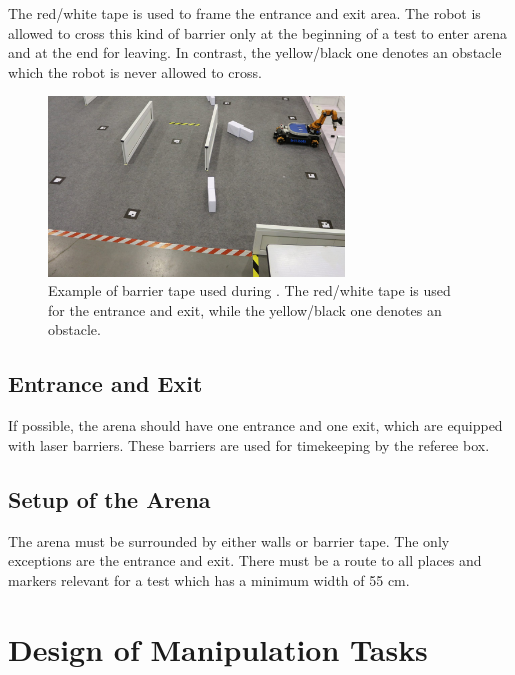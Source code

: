 The red/white tape is used to frame the entrance and exit area. The robot is allowed to cross this kind of barrier only at the beginning of a test to enter arena and at the end for leaving. In contrast, the yellow/black one denotes an obstacle which the robot is never allowed to cross. 

\begin{figure} [h!]
\centering
\includegraphics[width= 0.7\textwidth ]{./images/barrier_tapes_in_china15.jpg}
\caption{Example of barrier tape used during . The red/white tape is used for the entrance and exit, while the yellow/black one denotes an obstacle.}
\label{fig:barrier_tape}
\end{figure}


\subsection{Entrance and Exit}
If possible, the arena should have one entrance and one exit, which are equipped with laser barriers. These barriers are used for timekeeping by the referee box.

\subsection{Setup of the Arena}
The arena must be surrounded by either walls or barrier tape. The only exceptions are the entrance and exit. There must be a route to all places and markers relevant for a test which has a minimum width of 55 cm.

\section{Design of Manipulation Tasks}
\label{sec:ManipulationTasks}

